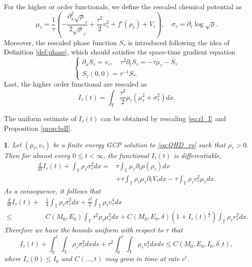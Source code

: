 \documentclass[leqno]{amsart}
\theoremstyle{plain}
\theoremstyle{definition}
\theoremstyle{remark}
\theoremstyle{plain}
\theoremstyle{plain}
\newtheorem{prop}[thm]{\protect\propositionname}
\providecommand{\propositionname}{Proposition}
\def\T{{\mathbb T}}%
\def\d{{\partial}}
\numberwithin{equation}{section}
\begin{document}
For the higher or order functionals, we define the rescaled chemical potential as
\begin{equation}\label{eq:chem_rs}
\mu_\tau=\frac{1}{\tau}\left(-\frac{\d_x^2\sqrt\rho_\tau}{2\sqrt\rho_\tau}+\frac{\tau^2}{2}v_\tau^2+f'(\rho_\tau)+V_\tau\right),\quad \sigma_\tau=\d_t\log\sqrt{\rho}.
\end{equation}
Moreover, the rescaled phase function $S_\tau$ is introduced following the idea of Definition \ref{def:phase}, which should satisfies the space-time gradient equation
\begin{equation}\label{eq:gradS_rs}
\begin{cases}
\d_xS_\tau =v_\tau,\quad\tau^2\d_t S_\tau=-\tau\mu_\tau-S_\tau \\
S_\tau(0,0)=\tau^{-1}S_*.
\end{cases}
\end{equation}
Last, the higher order functional are rescaled as
\begin{equation}\label{eq:higher_rs}
I_\tau(t)=\int_T\frac{\tau^2}{2}\rho_\tau(\mu_\tau^2+\sigma_\tau^2)dx.
\end{equation}

The uniform estimate of $I_\tau(t)$ can be obtained by rescaling \eqref{eq:rl_I} and Proposition \ref{prop:bdI}.


\begin{prop}\label{prop:bdI_rs}
Let $(\rho_\tau, v_\tau)$ be a finite energy GCP solution to \eqref{eq:QHD_rs} such that $\rho_\tau>0$. Then for almost every $0\leq t<\infty$, the functional $I_\tau(t)$ is differentiable, 
\begin{equation}\label{eq:dispI_rs}
\begin{aligned}
\frac{d}{dt}I_\tau(t)+\int_\T \rho_\tau\sigma_\tau^2 dx=&\tau\int_\T\mu_\tau\d_tp(\rho_\tau)dx\\
&+\tau\int_\T\rho_\tau\mu_\tau\d_tV_\tau dx-\tau\int_\T\rho_\tau v_\tau^2\mu_\tau dx.
\end{aligned}
\end{equation}
As a consequence, it follows that
\begin{equation}\label{eq:ineqI_rs}
\begin{aligned}
\frac{d}{dt} I_\tau(t)+&\frac14\int_\T\rho_\tau\sigma_\tau^2dx+\frac{\tau^2}{2}\int_\T \rho_\tau v_\tau^4 dx \\
\leq & C(M_0,E_0)\int_\T\tau^2\rho_\tau\mu_\tau^2 dx+C(M_0,E_0,\delta)(1+I_\tau(t)^\frac12)\int_\T \rho_\tau v_\tau^2dx.
\end{aligned}
\end{equation}
Therefore we have the bounds uniform with respect to $\tau$ that
\begin{equation}\label{eq:bdI_rs}
I_\tau(t)+\int_0^t\int_\T \rho_\tau\sigma_\tau^2 dxds+\tau^2\int_0^t\int_\T \rho_\tau v_\tau^4 dxds\leq C(M_0,E_0,I_0,\delta,t),
\end{equation}
where $I_\tau(0)\leq I_0$ and $C(\dots,t)$ may grow in time at rate $e^{t}$.
\end{prop}
\end{document}
